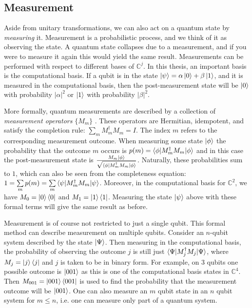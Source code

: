 \documentclass[12pt]{dalthesis}
\begin{document}
\subsection{Measurement}
Aside from unitary transformations, we can also act on a quantum state by \emph{measuring} it. Measurement is a probabilistic process, and we think of it as observing the state. A quantum state collapses due to a measurement, and if you were to measure it again this would yield the same result. Measurements can be performed with respect to different bases of $\mathbb{C}^j$. In this thesis, an important basis is the computational basis. If a qubit is in the state $\ket{\psi} = \alpha \ket{0} + \beta \ket{1}$, and it is measured in the computational basis, then the post-measurement state will be $\ket{0}$ with probability $|\alpha |^2$ or $\ket{1}$ with probability $|\beta |^2$. 

More formally, quantum measurements are described by a collection of \emph{measurement operators} $\{ M_m \}$ \cite[p. 85]{nielsen00}. These operators are Hermitian, idempotent, and satisfy the completion rule: $\sum\limits_{m} M^{\dag}_mM_m = I$. The index $m$ refers to the corresponding measurement outcome. When measuring some state $\ket{\phi}$ the probability that the outcome $m$ occurs is $p(m) = \braket{\phi | M^{\dag}_m M_m | \phi}$ and in this case the post-measurement state is $\frac{M_m \ket{\phi}}{\sqrt{\braket{\phi | M^{\dag}_m M_m | \phi}}}$. Naturally, these probabilities sum to $1$, which can also be seen from the completeness equation: $1 = \sum\limits_{m} p(m) = \sum\limits_{m} \braket{\psi |M^{\dag}_mM_m| \psi}$. Moreover, in the computational basis for $\mathbb{C}^2$, we have $M_0 = \ket{0} \bra{0}$ and $M_1 = \ket{1} \bra{1}$. Measuring the state $\ket{\psi}$ above with these formal terms will give the same result as before. 

Measurement is of course not restricted to just a single qubit. This formal method can describe measurement on multiple qubits. Consider an $n$-qubit system described by the state $\ket{\Psi}$. Then measuring in the computational basis, the probability of observing the outcome $j$ is still just $\braket{\Psi | M^{\dag}_j M_j | \Psi}$, where $M_j = \ket{j} \bra{j}$ and $j$ is taken to be in binary form. For example, on $3$ qubits one possible outcome is $\ket{001}$ as this is one of the computational basis states in $\mathbb{C}^4$. Then $M_{001} = \ket{001}\bra{001}$ is used to find the probability that the measurement outcome will be $\ket{001}$. One can also measure an $m$ qubit state in an $n$ qubit system for $m \leq n$, i.e. one can measure only part of a quantum system.
\end{document}
